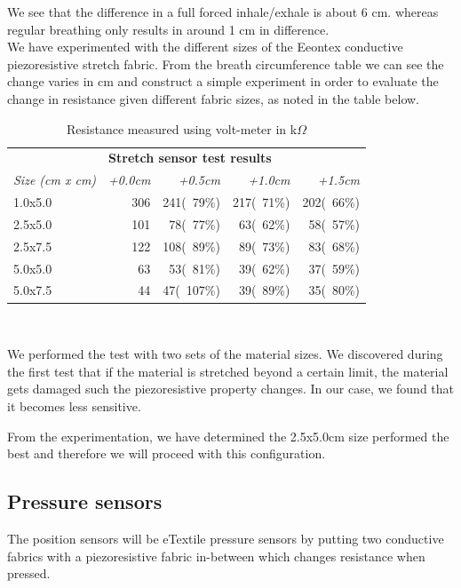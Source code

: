 \documentclass{sigchi-ext}
\begin{document}
We see that the difference in a full forced inhale/exhale is about 6 cm. whereas regular
breathing only results in around 1 cm in difference.\\
We have experimented with the different sizes of the Eeontex conductive piezoresistive
stretch fabric. From the breath circumference table we can see the change varies in cm and construct a simple experiment in order to evaluate the change in resistance given
different fabric sizes, as noted in the table below.
\begin{table}[H]
  \centering
  \begin{tabular}{l r r r r}
    & \multicolumn{4}{l}{\small{\textbf{Stretch sensor test results}}} \\
    \cmidrule(r){2-4}
    {\small\textit{Size (cm x cm)}}
    & {\small \textit{+0.0cm}}
    & {\small \textit{+0.5cm}}
    & {\small \textit{+1.0cm}}
    & {\small \textit{+1.5cm}} \\
    \midrule
    1.0x5.0    & 306 & 241(~79\%) & 217(~71\%) & 202(~66\%)\\
    2.5x5.0    & 101 & 78(~77\%)  & 63(~62\%)  & 58(~57\%) \\
    2.5x7.5    & 122 & 108(~89\%) & 89(~73\%)  & 83(~68\%) \\
    5.0x5.0    & 63  & 53(~81\%)  & 39(~62\%)  & 37(~59\%) \\
    5.0x7.5    & 44  & 47(~107\%)  & 39(~89\%)  & 35(~80\%) \\
  \end{tabular}
  \caption{Resistance measured using volt-meter in k$\Omega$}~\label{tab:stretch-test}
\end{table}
We performed the test with two sets of the material sizes.
We discovered during the first test that if the material
is stretched beyond a certain limit, the material gets
damaged such the piezoresistive property changes. In our case,
we found that it becomes less sensitive.

From the experimentation, we have determined the 2.5x5.0cm size
performed the best and therefore we will proceed with this
configuration.

\clearpage

\subsection{Pressure sensors}
The position sensors will be eTextile pressure sensors by putting two conductive
fabrics with a piezoresistive fabric in-between which changes resistance when
pressed.
\end{document}

